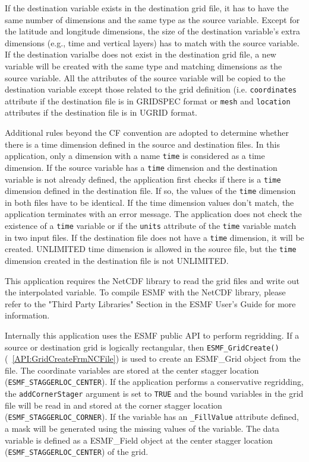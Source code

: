 If the destination 
variable exists in the destination grid file, it has to have the same number of dimensions and the same type as the source variable. Except for the latitude and longitude dimensions, the size of 
the destination variable's extra dimensions (e.g., time and vertical layers) has to match with the 
source variable.   If the destination varialbe does not exist in the destination grid file, a
new variable will be created with the same type and matching dimensions as the source variable.
All the attributes of the source variable will be copied to the destination variable except those
related to the grid definition (i.e. {\tt coordinates} attribute if the destination file is in  
GRIDSPEC format or {\tt mesh} and {\tt location} attributes if the destination file is in UGRID format.

Additional rules beyond the CF convention are adopted to determine whether there is a time dimension defined
in the source and destination files.  In this application, only a dimension with a name {\tt time} is 
considered as a time dimension.
If the source variable has a {\tt time} dimension and the destination variable is not already defined, 
the application first checks if there is a {\tt time} dimension defined in the destination file.  If so, 
the values of the {\tt time} dimension in both files have to be identical.  If the time dimension values don't match, the application
terminates with an error message.  The application does not check the existence of a {\tt time} variable 
or if the {\tt units} attribute of the {\tt time} variable match in two input files.  If the destination 
file does not have a {\tt time} dimension, it will be created.  UNLIMITED time dimension is allowed in the
source file, but the {\tt time} dimension created in the destination file is not UNLIMITED.

This application requires the NetCDF library to read the grid files and write out the interpolated variable.  To compile ESMF with
the NetCDF library, please refer to the "Third Party Libraries" Section in the ESMF User's Guide for more information.

Internally this application uses the ESMF public API to perform regridding.
If a source or destination grid is logically rectangular, then {\tt ESMF\_GridCreate()}(~\ref{API:GridCreateFrmNCFile}) is used to create an ESMF\_Grid object from the file. The coordinate variables are stored
at the center stagger location ({\tt ESMF\_STAGGERLOC\_CENTER}).  If the application performs a 
conservative regridding, the {\tt addCornerStager} argument is set to {\tt TRUE} and the bound variables in the grid file will
be read  in and stored at the corner stagger location ({\tt ESMF\_STAGGERLOC\_CORNER}).  If the variable has an {\tt \_FillValue} attribute defined, a mask will be generated using the missing values of the variable. 
The data variable is defined as a ESMF\_Field object at the center stagger location ({\tt ESMF\_STAGGERLOC\_CENTER}) of the grid.   

